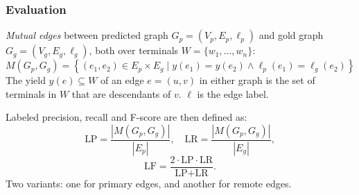 \documentclass[t]{beamer}
\begin{document}
\begin{frame}
\frametitle{Evaluation}
\textit{Mutual edges} between predicted graph $G_p=(V_p,E_p,\ell_p)$
and gold graph $G_g=(V_g,E_g,\ell_g)$,
both over terminals $W = \{w_1,\ldots,w_n\}$:
\[
M(G_p,G_g) =
    \left\{(e_1,e_2) \in E_p \times E_g \;|\;
    y(e_1) = y(e_2) \wedge \ell_p(e_1)=\ell_g(e_2)\right\}
\]
The yield $y(e) \subseteq W$ of an edge $e=(u,v)$ in either graph
is the set of terminals in $W$ that are descendants of $v$. \hfill
$\ell$ is the edge label.

\vfill
\pause
Labeled precision, recall and F-score are then defined as:
\[
\text{LP} = \frac{|M(G_p,G_g)|}{|E_p|},\quad
\text{LR} = \frac{|M(G_p,G_g)|}{|E_g|},
\]
\[
\text{LF} = \frac{2 \cdot \text{LP} \cdot \text{LR}}{\text{LP} + \text{LR}}.
\]
Two variants:
one for primary edges, and another for remote edges.
\end{frame}
\end{document}
